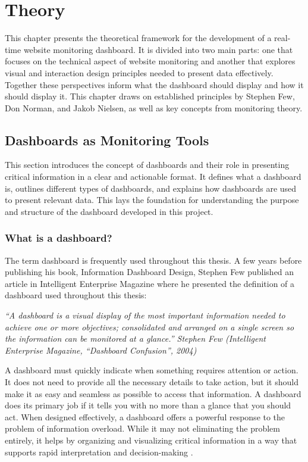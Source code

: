 \chapter{Theory}
\label{ch:theory}

This chapter presents the theoretical framework for the development of a real-time website monitoring dashboard. It is divided into two main parts: one that focuses on the technical aspect of website monitoring and another that explores visual and interaction design principles needed to present data effectively. Together these perspectives inform what the dashboard should display and how it should display it. This chapter draws on established principles by Stephen Few, Don Norman, and Jakob Nielsen, as well as key concepts from monitoring theory. 
 

\section{Dashboards as Monitoring Tools}
\label{dashboard_information_overview}

This section introduces the concept of dashboards and their role in presenting critical information in a clear and actionable format. It defines what a dashboard is, outlines different types of dashboards, and explains how dashboards are used to present relevant data. This lays the foundation for understanding the purpose and structure of the dashboard developed in this project.

\subsection{What is a dashboard?}
\label{subsec:what_is_dashboard}

The term dashboard is frequently used throughout this thesis. A few years before publishing his book, Information Dashboard Design, Stephen Few published an article in Intelligent Enterprise Magazine where he presented the definition of a dashboard used throughout this thesis:

\textit{“A dashboard is a visual display of the most important information needed to achieve one or more objectives; consolidated and arranged on a single screen so the information can be monitored at a glance.” Stephen Few (Intelligent Enterprise Magazine, “Dashboard Confusion”, 2004)}

A dashboard must quickly indicate when something requires attention or action. It does not need to provide all the necessary details to take action, but it should make it as easy and seamless as possible to access that information. A dashboard does its primary job if it tells you with no more than a glance that you should act. When designed effectively, a dashboard offers a powerful response to the problem of information overload. While it may not eliminating the problem entirely, it helps by organizing and visualizing critical information in a way that supports rapid interpretation and decision-making \autocite[p. 28]{FewDashboard}.

